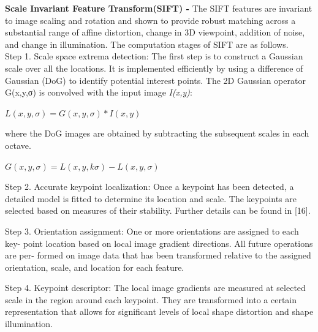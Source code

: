\textbf{Scale Invariant Feature Transform(SIFT) - } The SIFT features are invariant to image scaling and rotation and shown to provide robust matching across a substantial range of affine distortion, change in 3D viewpoint, addition of noise, and change in illumination. The computation stages of SIFT are as follows.\\
Step 1. Scale space extrema detection: The first step is to construct a Gaussian scale over all the locations. It is implemented efficiently by using a difference of Gaussian (DoG) to identify potential interest points. The 2D Gaussian operator G(x,y,σ) is convolved with the input image \textit{I(x,y)}:
\begin{center}
	$L(x,y,\sigma) = G(x,y,\sigma) * I(x,y)$
\end{center}
where the  DoG images are obtained by subtracting the subsequent scales in each octave.
\begin{center}
	$G(x,y,\sigma) = L(x,y,k\sigma) - L(x,y,\sigma)$
\end{center}

Step 2. Accurate keypoint localization: Once a keypoint has been detected, a detailed model is fitted to determine its location and scale. The keypoints are selected based on measures of their stability. Further details can be found in [16]. 

Step 3. Orientation assignment: One or more orientations are assigned to each key- point location based on local image gradient directions. All future operations are per- formed on image data that has been transformed relative to the assigned orientation, scale, and location for each feature.

Step 4. Keypoint descriptor: The local image gradients are measured at selected scale in the region around each keypoint. They are transformed into a certain representation that allows for significant levels of local shape distortion and shape illumination.

